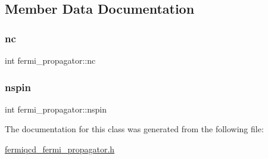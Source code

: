 \subsection{Member Data Documentation}
\mbox{\label{classfermi__propagator_a75d862433489db5a07b2ced97c21f9cc}} 
\subsubsection{\texorpdfstring{nc}{nc}}
{\footnotesize\ttfamily int fermi\+\_\+propagator\+::nc}

\mbox{\label{classfermi__propagator_a5eae6edf77379e878f84281aa9e32316}} 
\subsubsection{\texorpdfstring{nspin}{nspin}}
{\footnotesize\ttfamily int fermi\+\_\+propagator\+::nspin}



The documentation for this class was generated from the following file\+:\begin{DoxyCompactItemize}
\item 
\hyperlink{fermiqcd__fermi__propagator_8h}{fermiqcd\+\_\+fermi\+\_\+propagator.\+h}\end{DoxyCompactItemize}
